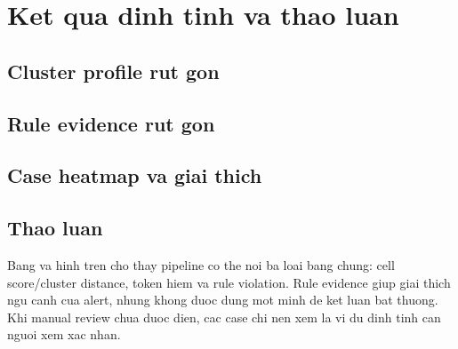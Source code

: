 \chapter{Ket qua dinh tinh va thao luan}

\section{Cluster profile rut gon}



\section{Rule evidence rut gon}



\section{Case heatmap va giai thich}



\section{Thao luan}

Bang va hinh tren cho thay pipeline co the noi ba loai bang chung: cell score/cluster distance, token hiem va rule violation. Rule evidence giup giai thich ngu canh cua alert, nhung khong duoc dung mot minh de ket luan bat thuong. Khi manual review chua duoc dien, cac case chi nen xem la vi du dinh tinh can nguoi xem xac nhan.
